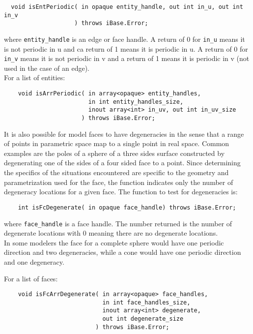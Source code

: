 \documentclass{article}
\begin{document}
\begin{verbatim}
  void isEntPeriodic( in opaque entity_handle, out int in_u, out int in_v
                    ) throws iBase.Error;
\end{verbatim}
where {\tt entity\_handle} is an edge or face handle. A 
return of 0 for {\tt in\_u} means it is not periodic in u and 
ca return of 1 means it is periodic in u. A return of 0 for {\tt in\_v} means 
it is not periodic in v and a return of 1 means it is periodic 
in v (not used in the case of an edge).\\

\hspace{-16pt}For a list of entities:

\begin{verbatim}
    void isArrPeriodic( in array<opaque> entity_handles, 
                        in int entity_handles_size,
                        inout array<int> in_uv, out int in_uv_size
                      ) throws iBase.Error;
\end{verbatim}
 
It is also possible for model faces to have degeneracies 
in the sense that a range of points in parametric space map to 
a single point in real space. Common examples are the poles of 
a sphere of a three sides surface constructed by degenerating 
one of the sides of a four sided face to a point. Since determining 
the specifics of the situations encountered are specific to the 
geometry and parametrization used for the face, the function 
indicates only the number of degeneracy locations for a given 
face. The function to test for degeneracies is:

\begin{verbatim}
    int isFcDegenerate( in opaque face_handle) throws iBase.Error;
\end{verbatim}
where {\tt face\_handle} is a face handle. The number returned 
is the number of degenerate locations with 0 meaning there are 
no degenerate locations. \\

In some modelers the face for a complete sphere would have 
one periodic direction and two degeneracies, while a cone would 
have one periodic direction and one degeneracy.


\hspace{-16pt}For a list of faces:

\begin{verbatim}
    void isFcArrDegenerate( in array<opaque> face_handles, 
                            in int face_handles_size,
                            inout array<int> degenerate, 
                            out int degenerate_size
                          ) throws iBase.Error;
\end{verbatim}
\end{document}
